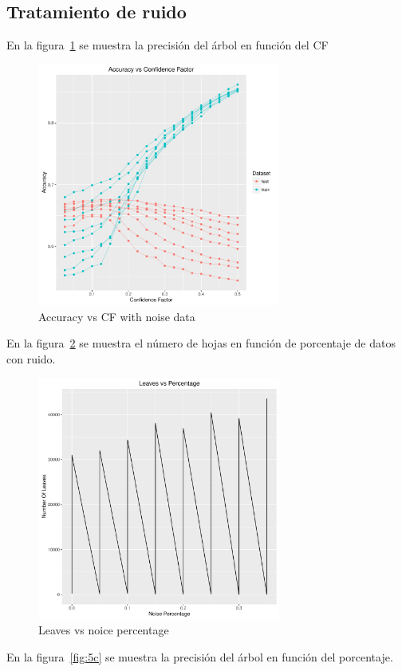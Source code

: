 \subsection{Tratamiento de ruido}

En la figura~\ref{fig:5a} se muestra la precisión del árbol en función del CF

\begin{figure}
  \centering
  \includegraphics[width = 8cm]{5a.pdf}
  \caption{Accuracy vs CF with noise data}
  \label{fig:5a}
\end{figure}

En la figura~\ref{fig:5b} se muestra el número de hojas en función de porcentaje de datos con ruido.

\begin{figure}
  \centering
  \includegraphics[width = 8cm]{5b.pdf}
  \caption{Leaves vs noice percentage}
  \label{fig:5b}
\end{figure}

En la figura~\ref{fig:5c} se muestra la precisión del árbol en función del porcentaje.

